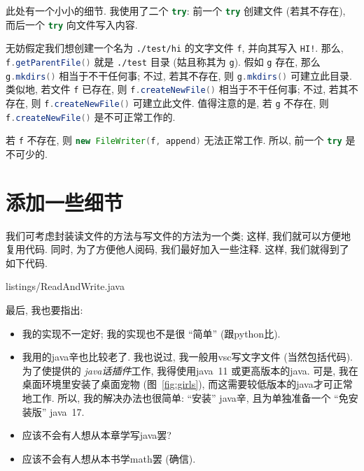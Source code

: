 此处有一个小小的细节.
我使用了二个 \lstinline[language=Java]`try`:
前一个 \lstinline[language=Java]`try` 创建文件 (若其不存在),
而后一个 \lstinline[language=Java]`try` 向文件写入内容.

无妨假定我们想创建一个名为 \verb`./test/hi`
的文字文件 \lstinline[language=Java]`f`,
并向其写入 \verb`HI!`.
那么, \lstinline[language=Java]`f.getParentFile()`
就是 \verb`./test` 目录
(姑且称其为 \lstinline[language=Java]`g`).
假如 \lstinline[language=Java]`g` 存在,
那么 \lstinline[language=Java]`g.mkdirs()`
相当于不干任何事;
不过, 若其不存在, 则 \lstinline[language=Java]`g.mkdirs()`
可建立此目录.
类似地, 若文件 \lstinline[language=Java]`f` 已存在,
则 \lstinline[language=Java]`f.createNewFile()`
相当于不干任何事;
不过, 若其不存在,
则 \lstinline[language=Java]`f.createNewFile()`
可建立此文件.
值得注意的是, 若 \lstinline[language=Java]`g` 不存在,
则 \lstinline[language=Java]`f.createNewFile()`
是不可正常工作的.

若 \lstinline[language=Java]`f` 不存在,
则 \lstinline[language=Java]`new FileWriter(f, append)`
无法正常工作.
所以, 前一个 \lstinline[language=Java]`try` 是不可少的.

\section{添加一些细节}

我们可考虑封装读文件的方法与写文件的方法为一个类;
这样, 我们就可以方便地复用代码.
同时, 为了方便他人阅码, 我们最好加入一些注释.
这样, 我们就得到了如下代码.


{listings/ReadAndWrite.java}

最后, 我也要指出:
\begin{itemize}
    \item 我的实现不一定好;
          我的实现也不是很 ``简单'' (跟\gls{python}比).
    \item 我用的\gls{java}辛也比较老了.
          我也说过, 我一般用\gls{vsc}写文字文件 (当然包括代码).
          为了使提供的%
          \emph{\gls{java}话插件}工作,
          我得使用\gls{java}~11 或更高版本的\gls{java}.
          可是, 我在桌面环境里安装了桌面宠物 (图~\ref{fig:girls}),
          而这需要较低版本的\gls{java}才可正常地工作.
          所以, 我的解决办法也很简单:
          ``安装'' \gls{java}辛,
          且为单独准备一个
          ``免安装版'' \gls{java}~17.
    \item 应该不会有人想从本章学写\gls{java}罢?
    \item 应该不会有人想从本书学\gls{math}罢 (确信).
\end{itemize}

